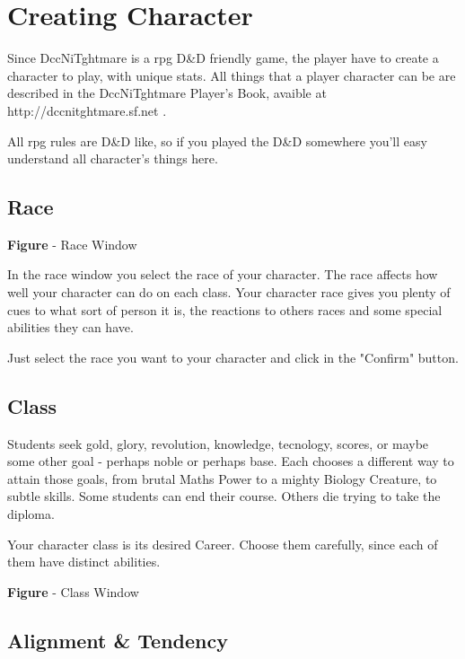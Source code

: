 \documentclass[ letterpaper,12pt]{article}
\begin{document}
\section{Creating Character}

Since DccNiTghtmare is a rpg D\&D friendly game, the player have to create a
character to play, with unique stats. All things that a player character can be
are described in the DccNiTghtmare Player's Book, avaible at
http://dccnitghtmare.sf.net .

All rpg rules are D\&D like, so if you played the D\&D somewhere you'll easy
understand all character's things here.

\subsection{Race}

\begin{center}
{\bf Figure} - Race Window
\end{center}

In the race window you select the race of your character. The race affects how
well your character can do on each class. Your character race gives you plenty
of cues to what sort of person it is, the reactions to others races and some
special abilities they can have.

Just select the race you want to your character and click in the "Confirm"
button.

\subsection{Class}

Students seek gold, glory, revolution, knowledge, tecnology, scores, or maybe
some other goal - perhaps noble or perhaps base. Each chooses a different way
to attain those goals, from brutal Maths Power to a mighty Biology Creature, to
subtle skills. Some students can end their course. Others die trying to take
the diploma.

Your character class is its desired Career. Choose them carefully, since each
of them have distinct abilities.

\begin{center}
{\bf Figure} - Class Window
\end{center}


\subsection{Alignment \& Tendency}
\end{document}
